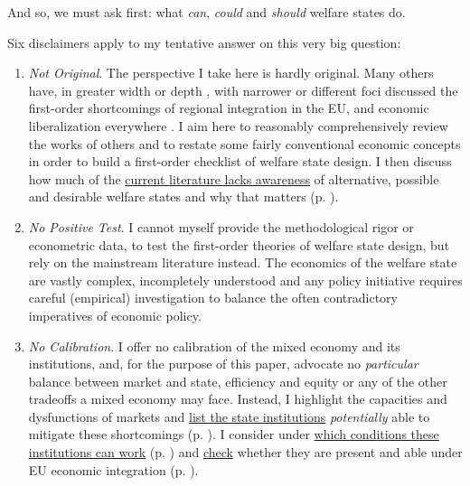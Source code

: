 \documentclass[11pt,a4paper,oneside,openright]{article}
\begin{document}
And so, we must ask first: 
what \emph{can}, \emph{could} and \emph{should} welfare states do. 

Six disclaimers apply to my tentative answer on this very big question: \label{sec:disclaimers}

\begin{enumerate}
	\item \label{it:not_original} \emph{Not Original}. 
		The perspective I take here is hardly original. 
		Many others have, in greater width \citep{Stiglitz2002} or depth \citep{Sinn2004}, with narrower \citep{Scharpf1997} or different foci \citep{Zurn-2000-aa} discussed the first-order shortcomings of regional integration in the \gls{EU}, and economic liberalization everywhere \citep{Stiglitz2002}. 
		I aim here to reasonably comprehensively review the works of others and to restate some fairly conventional economic concepts in order to build a first-order checklist of welfare state design. 
		I then discuss how much of the \hyperref[sec:Literature]{current literature lacks awareness} of alternative, possible and desirable welfare states and why that matters (p. \pageref{sec:Literature}).
	
	\item \label{it:no_test} \emph{No Positive Test}. 
		I cannot myself provide the methodological rigor or econometric data, to test the first-order theories of welfare state design, but rely on the mainstream literature instead. 
		The economics of the welfare state are vastly complex, incompletely understood and any policy initiative requires careful (empirical) investigation to balance the often contradictory imperatives of economic policy. 
	
	\item \label{it:no_calibration} \emph{No Calibration}. 
		I offer no calibration of the mixed economy and its institutions, and, for the purpose of this paper, advocate no \emph{particular} balance between market and state, efficiency and equity or any of the other tradeoffs a mixed economy may face. 
		Instead, I highlight the capacities and dysfunctions of markets and \hyperref[sec:ends]{list the state institutions} \emph{potentially} able to mitigate these shortcomings (p. \pageref{sec:ends}). 
		I consider under \hyperref[sec:means]{which conditions these institutions can work} (p. \pageref{sec:means}) and \hyperref[sec:defunct]{check} whether they are present and able under \gls{EU} economic integration (p. \pageref{sec:defunct}).
	

\end{enumerate}
\end{document}
